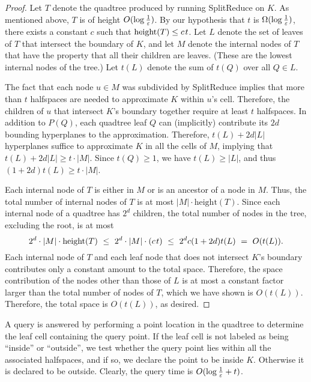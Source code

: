 \documentclass[11pt]{article}   \usepackage[letterpaper,hmargin=2.1cm,vmargin=3cm]{geometry}
\newcommand{\inv}[1]{\frac{1}{#1}}
\newcommand{\alg}{\textrm{SplitReduce}}
\renewcommand{\P}{\kern+1pt}    \newcommand{\N}{\kern-2pt}      \newcommand{\NN}{\kern-4pt}     \newcommand{\polar}[1]{\mathrm{polar}(#1)}            \newcommand{\polarX}[2]{\mathrm{polar}_{#1}(#2)}
\begin{document}
\begin{proof}
Let $T$ denote the quadtree produced by running {\alg} on $K$. As mentioned above, $T$ is of height $O(\log \inv{\eps} )$. By our hypothesis that $t$ is $\Omega(\log \inv{\eps} )$, there exists a constant $c$ such that $\textrm{height}(T) \le c \P t$. Let $L$ denote the set of leaves of $T$ that intersect the boundary of $K$, and let $M$ denote the internal nodes of $T$ that have the property that all their children are leaves. (These are the lowest internal nodes of the tree.) Let $t(L)$ denote the sum of $t(Q)$ over all $Q \in L$.

The fact that each node $u \in M$ was subdivided by {\alg} implies that more than $t$ halfspaces are needed to approximate $K$ within $u$'s cell. Therefore, the children of $u$ that intersect $K$'s boundary together require at least $t$ halfspaces. In addition to $P(Q)$, each quadtree leaf $Q$ can (implicitly) contribute its $2 d$ bounding hyperplanes to the approximation. Therefore, $t(L) + 2 d |L|$ hyperplanes suffice to approximate $K$ in all the cells of $M$, implying that $t(L) + 2 d |L| \ge t \cdot |M|$. Since $t(Q) \ge 1$, we have $t(L) \ge |L|$, and thus $(1 + 2 d) t(L) \ge t \cdot |M|$. 

Each internal node of $T$ is either in $M$ or is an ancestor of a node in $M$. Thus, the total number of internal nodes of $T$ is at most $|M| \cdot \textrm{height}(T)$. Since each internal node of a quadtree has $2^d$ children, the total number of nodes in the tree, excluding the root, is at most
\[
	2^d \cdot |M| \cdot \textrm{height}(T)
		~ \le ~ 2^d \cdot |M| \cdot (c \P t)
		~ \le ~ 2^d c  (1 + 2 d) t(L)
		~  =  ~ O(t(L)).
\]
Each internal node of $T$ and each leaf node that does not intersect $K$'s boundary contributes only a constant amount to the total space. Therefore, the space contribution of the nodes other than those of $L$ is at most a constant factor larger than the total number of nodes of $T$, which we have shown is $O(t(L))$. Therefore, the total space is $O(t(L))$, as desired.
\end{proof}


A query is answered by performing a point location in the quadtree to determine the leaf cell containing the query point. If the leaf cell is not labeled as being ``inside'' or ``outside'', we test whether the query point lies within all the associated halfspaces, and if so, we declare the point to be inside $K$. Otherwise it is declared to be outside. Clearly, the query time is $O(\log \inv{\eps} + t)$.
\end{document}
